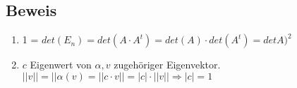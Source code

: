 \documentclass[a4paper, openany]{book}
\begin{document}
        \subsection{Beweis}

        \begin{enumerate}[label=(\alph*)]
          \item 1 = $det(E_n) = det(A \cdot A^t) = det(A) \cdot det(A^t) = detA)^2$

          \item $c$ Eigenwert von $\alpha, v$ zugehöriger Eigenvektor. $||v|| = ||\alpha(v) = || c \cdot v|| = |c| \cdot ||v|| \Rightarrow |c| = 1$

        \end{enumerate}


        
\end{document}
